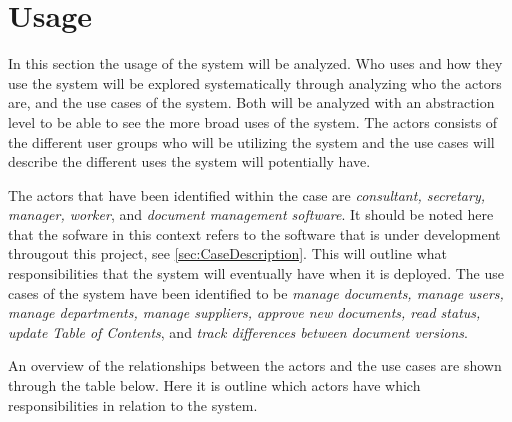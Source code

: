 \section{Usage}

In this section the usage of the system will be analyzed.
Who uses and how they use the system will be explored systematically through analyzing who the actors are, and the use cases of the system.
Both will be analyzed with an abstraction level to be able to see the more broad uses of the system.
The actors consists of the different user groups who will be utilizing the system and the use cases will describe the different uses the system will potentially have.

The actors that have been identified within the case are \textit{consultant, secretary, manager, worker}, and \textit{document management software}.
It should be noted here that the sofware in this context refers to the software that is under development througout this project, see \cref{sec:CaseDescription}.
This will outline what responsibilities that the system will eventually have when it is deployed.
The use cases of the system have been identified to be \textit{manage documents, manage users, manage departments, manage suppliers, approve new documents, read status, update Table of Contents}, and \textit{track differences between document versions}.

An overview of the relationships between the actors and the use cases are shown through the table below.
Here it is outline which actors have which responsibilities in relation to the system.

